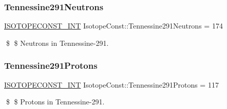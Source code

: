 \subsubsection{\texorpdfstring{Tennessine291\+Neutrons}{Tennessine291Neutrons}}
{\footnotesize\ttfamily \mbox{\hyperlink{group___isotope_const-_macros_ga5f18360b3e99483a35c32d789e62621c}{I\+S\+O\+T\+O\+P\+E\+C\+O\+N\+S\+T\+\_\+\+I\+NT}} Isotope\+Const\+::\+Tennessine291\+Neutrons = 174}

\$ \$ Neutrons in Tennessine-\/291. \mbox{\label{group___isotope_const-_tennessine-_ts291_ga0b1685c5a15472d05e575d7273da7917}} 
\subsubsection{\texorpdfstring{Tennessine291\+Protons}{Tennessine291Protons}}
{\footnotesize\ttfamily \mbox{\hyperlink{group___isotope_const-_macros_ga5f18360b3e99483a35c32d789e62621c}{I\+S\+O\+T\+O\+P\+E\+C\+O\+N\+S\+T\+\_\+\+I\+NT}} Isotope\+Const\+::\+Tennessine291\+Protons = 117}

\$ \$ Protons in Tennessine-\/291. 